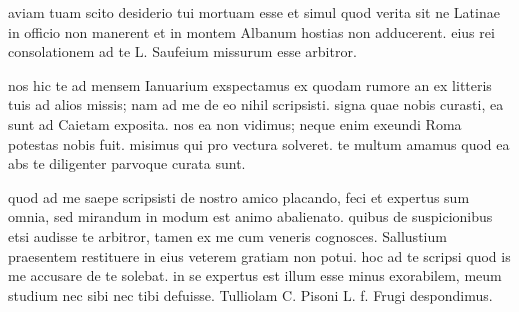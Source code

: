 


 aviam tuam scito desiderio tui mortuam esse et simul quod verita sit ne Latinae in officio non manerent et in montem Albanum hostias non adducerent. eius rei consolationem ad te L. Saufeium missurum esse arbitror.

 nos hic te ad mensem Ianuarium exspectamus ex quodam rumore an ex litteris tuis ad alios missis; nam ad me de eo nihil scripsisti. signa quae nobis curasti, ea sunt ad Caietam exposita. nos ea non vidimus; neque enim exeundi Roma potestas nobis fuit. misimus qui pro vectura solveret. te multum amamus quod ea abs te diligenter parvoque curata sunt.

 quod ad me saepe scripsisti de nostro amico placando, feci et expertus sum omnia, sed mirandum in modum est animo abalienato. quibus de suspicionibus etsi audisse te arbitror, tamen ex me cum veneris cognosces. Sallustium praesentem restituere in eius veterem gratiam non potui. hoc ad te scripsi quod is me accusare de te solebat. in se expertus est illum esse minus exorabilem, meum studium nec sibi nec tibi defuisse. Tulliolam C. Pisoni L. f. Frugi despondimus.
